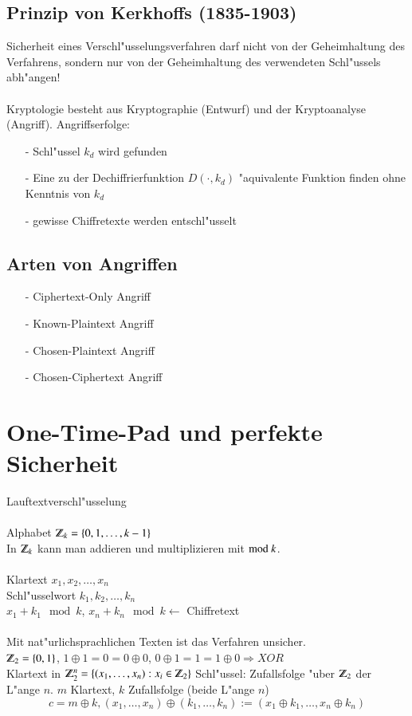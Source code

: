 \subsection{Prinzip von Kerkhoffs (1835-1903)}
Sicherheit eines Verschl"usselungsverfahren darf nicht von der Geheimhaltung des Verfahrens, sondern nur von der Geheimhaltung des verwendeten Schl"ussels abh"angen!
%
%
\\\\
Kryptologie besteht aus Kryptographie (Entwurf) und der Kryptoanalyse (Angriff).
Angriffserfolge:
\begin{itemize}
	\item[-] Schl"ussel $k_d$ wird gefunden
	\item[-] Eine zu der Dechiffrierfunktion $D(\cdot,k_d)$ "aquivalente Funktion finden ohne Kenntnis von $k_d$
	\item[-] gewisse Chiffretexte werden entschl"usselt
\end{itemize}
\subsection{Arten von Angriffen}
\begin{itemize}
	\item[-] Ciphertext-Only Angriff
	\item[-] Known-Plaintext Angriff
	\item[-] Chosen-Plaintext Angriff
	\item[-] Chosen-Ciphertext Angriff
\end{itemize}

\section{One-Time-Pad und perfekte Sicherheit}

Lauftextverschl"usselung\\
\\
Alphabet $\Z_k=\{0,1,\ldots,k-1\}$\\
In $\Z_k$ kann man addieren und multiplizieren mit $\text{mod }k$.\\
\\
Klartext $x_1,x_2,\ldots,x_n$\\
Schl"usselwort $k_1,k_2,\ldots,k_n$\\
$x_1 + k_1 \mod{k}$, $x_n + k_n \mod{k} \leftarrow$ Chiffretext\\
\\
Mit nat"urlichsprachlichen Texten ist das Verfahren unsicher.\\
$\Z_2=\{0,1\}$, $1 \oplus 1 = 0 = 0 \oplus 0$, $0 \oplus 1 = 1 = 1 \oplus 0 \Rightarrow XOR$\\
Klartext in $\Z_2^n=\{(x_1,\ldots,x_n):x_i \in \Z_2\}$
Schl"ussel: Zufallsfolge "uber $\Z_2$ der L"ange $n$. $m$ Klartext, $k$ Zufallsfolge (beide L"ange $n$)
\[
	c=m\oplus k, (x_1,\ldots,x_n)\oplus(k_1,\ldots,k_n):=(x_1\oplus k_1,\ldots,x_n\oplus k_n)
\]


